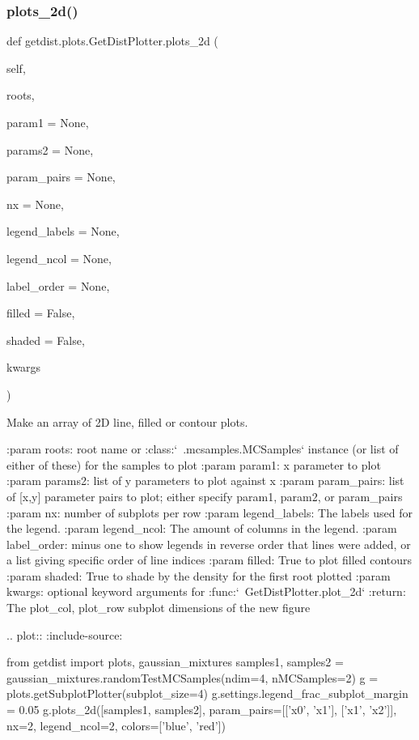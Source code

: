 \subsubsection{\texorpdfstring{plots\+\_\+2d()}{plots\_2d()}}
{\footnotesize\ttfamily def getdist.\+plots.\+Get\+Dist\+Plotter.\+plots\+\_\+2d (\begin{DoxyParamCaption}\item[{}]{self,  }\item[{}]{roots,  }\item[{}]{param1 = {\ttfamily None},  }\item[{}]{params2 = {\ttfamily None},  }\item[{}]{param\+\_\+pairs = {\ttfamily None},  }\item[{}]{nx = {\ttfamily None},  }\item[{}]{legend\+\_\+labels = {\ttfamily None},  }\item[{}]{legend\+\_\+ncol = {\ttfamily None},  }\item[{}]{label\+\_\+order = {\ttfamily None},  }\item[{}]{filled = {\ttfamily False},  }\item[{}]{shaded = {\ttfamily False},  }\item[{}]{kwargs }\end{DoxyParamCaption})}

\begin{DoxyVerb}Make an array of 2D line, filled or contour plots.

:param roots: root name or :class:`~.mcsamples.MCSamples` instance (or list of either of these) for the samples to plot
:param param1: x parameter to plot
:param params2: list of y parameters to plot against x
:param param_pairs: list of [x,y] parameter pairs to plot; either specify param1, param2, or param_pairs
:param nx: number of subplots per row
:param legend_labels: The labels used for the legend.
:param legend_ncol: The amount of columns in the legend.
:param label_order: minus one to show legends in reverse order that lines were added, or a list giving specific order of line indices 
:param filled: True to plot filled contours
:param shaded: True to shade by the density for the first root plotted
:param kwargs: optional keyword arguments for :func:`~GetDistPlotter.plot_2d`
:return: The plot_col, plot_row subplot dimensions of the new figure

.. plot::
   :include-source: 

    from getdist import plots, gaussian_mixtures
    samples1, samples2 = gaussian_mixtures.randomTestMCSamples(ndim=4, nMCSamples=2)
    g = plots.getSubplotPlotter(subplot_size=4)
    g.settings.legend_frac_subplot_margin = 0.05
    g.plots_2d([samples1, samples2], param_pairs=[['x0', 'x1'], ['x1', 'x2']], 
                    nx=2, legend_ncol=2, colors=['blue', 'red'])
\end{DoxyVerb}
 

